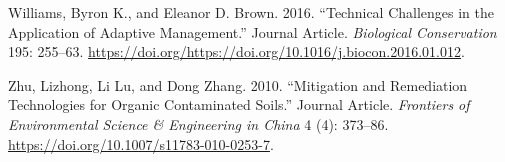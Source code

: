 \documentclass[fleqn,10pt]{wlpeerj} %
\begin{document}
\leavevmode\hypertarget{ref-Williams2016}{}%
Williams, Byron K., and Eleanor D. Brown. 2016. ``Technical Challenges
in the Application of Adaptive Management.'' Journal Article.
\emph{Biological Conservation} 195: 255--63.
\url{https://doi.org/https://doi.org/10.1016/j.biocon.2016.01.012}.

\leavevmode\hypertarget{ref-Zhu2010}{}%
Zhu, Lizhong, Li Lu, and Dong Zhang. 2010. ``Mitigation and Remediation
Technologies for Organic Contaminated Soils.'' Journal Article.
\emph{Frontiers of Environmental Science \& Engineering in China} 4 (4):
373--86. \url{https://doi.org/10.1007/s11783-010-0253-7}.
\end{document}
